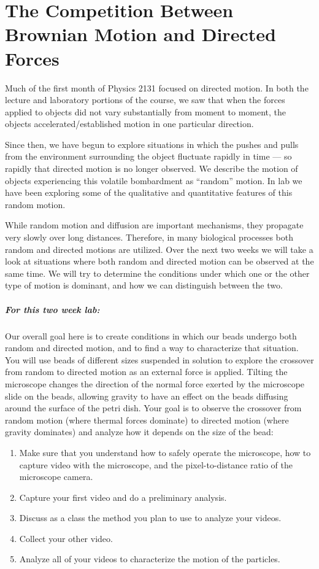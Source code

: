 \chapter{The Competition Between Brownian Motion and Directed Forces}
\thispagestyle{fancy}
%
Much of the first month of Physics 2131 focused on directed motion.
In both the lecture and laboratory portions of the course, we saw that when the forces applied to objects did not vary substantially from moment to moment, the objects accelerated/established motion in one particular direction.
\par
Since then, we have begun to explore situations in which the pushes and pulls from the environment surrounding the object fluctuate rapidly in time — so rapidly that directed motion is no longer observed. 
We describe the motion of objects experiencing this volatile bombardment as ``random'' motion. 
In lab we have been exploring some of the qualitative and quantitative features of this random motion.
\par
While random motion and diffusion are important mechanisms, they propagate very slowly over long distances. 
Therefore, in many biological processes both random and directed motions are utilized. 
Over the next two weeks we will take a look at situations where both random and directed motion can be observed at the same time. 
We will try to determine the conditions under which one or the other type of motion is dominant, and how we can distinguish between the two.
%
\paragraph{For this two week lab:} Our overall goal here is to create conditions in which our beads undergo both random and directed motion, and to find a way to characterize that situation. 
You will use beads of different sizes suspended in solution to explore the crossover from random to directed motion as an external force is applied.
Tilting the microscope changes the direction of the normal force exerted by the microscope slide on the beads, allowing gravity to have an effect on the beads diffusing around the surface of the petri dish.
Your goal is to observe the crossover from random motion (where thermal forces dominate) to directed motion (where gravity dominates) and analyze how it depends on the size of the bead:
\begin{enumerate}
\item Make sure that you understand how to safely operate the microscope, how to capture video with the microscope, and the pixel-to-distance ratio of the microscope camera.
\item Capture your first video and do a preliminary analysis.
\item Discuss as a class the method you plan to use to analyze your videos.
\item Collect your other video.
\item Analyze all of your videos to characterize the motion of the particles.
\end{enumerate}
%
